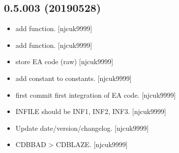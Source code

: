 \documentclass[a4paper,10pt,english]{report}
\begin{document}
\subsection{0.5.003 (2019\sphinxhyphen{}05\sphinxhyphen{}28)}
\label{\detokenize{misc/changelog:id153}}\begin{itemize}
\item {} 
 \sphinxhyphen{} add  function. {[}njcuk9999{]}

\item {} 
 \sphinxhyphen{} add  function. {[}njcuk9999{]}

\item {} 
 \sphinxhyphen{} store EA  code (raw) {[}njcuk9999{]}

\item {} 
 \sphinxhyphen{} add  constant to constants.
{[}njcuk9999{]}

\item {} 
 \sphinxhyphen{} first commit \sphinxhyphen{} first integration of EA
code. {[}njcuk9999{]}

\item {} 
 \sphinxhyphen{} INFILE should be INF1, INF2, INF3. {[}njcuk9999{]}

\item {} 
Update date/version/changelog. {[}njcuk9999{]}

\item {} 
 \sphinxhyphen{} CDBBAD \textendash{}\textgreater{} CDBLAZE. {[}njcuk9999{]}

\end{itemize}
\end{document}
